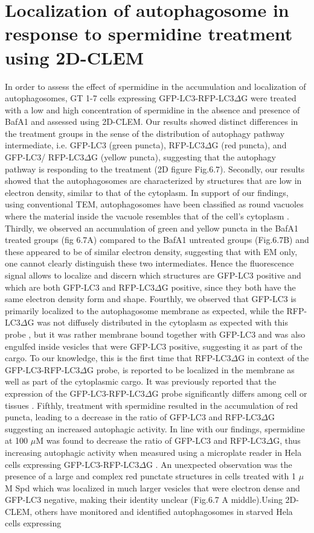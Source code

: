 \section{Localization of autophagosome in response to spermidine treatment using 2D-CLEM}
In order to assess the effect of spermidine in the accumulation and localization of  autophagosomes, GT 1-7 cells expressing GFP-LC3-RFP-LC3$\Delta$G were treated with a low and high concentration of spermidine in the absence and presence of BafA1 and assessed using 2D-CLEM. Our results showed distinct differences in the treatment groups in the sense of the distribution of autophagy pathway intermediate, i.e. GFP-LC3 (green puncta), RFP-LC3$\Delta$G (red puncta), and GFP-LC3/ RFP-LC3$\Delta$G (yellow puncta), suggesting that the autophagy pathway is responding to the treatment (2D figure Fig.6.7). Secondly, our results showed that the autophagosomes are characterized by structures that are low in electron density, similar to that of the cytoplasm. In support of our findings, using conventional TEM, autophagosomes have been classified as round vacuoles where the material inside the vacuole resembles that of the cell’s cytoplasm \citep{Eskelinen2008}. Thirdly, we observed an accumulation of green and yellow puncta in the BafA1 treated groups (fig 6.7A) compared to the BafA1 untreated groups (Fig.6.7B) and these appeared to be of similar electron density, suggesting that with EM only, one cannot clearly distinguish these two intermediates. Hence the fluorescence signal allows to localize and discern which structures are GFP-LC3 positive and which are both GFP-LC3 and RFP-LC3$\Delta$G positive, since they both have the same electron density form and shape. Fourthly, we observed that GFP-LC3 is primarily localized to the autophagosome membrane as expected, while the RFP-LC3$\Delta$G was not diffusely distributed in the cytoplasm as expected with this probe \citep{Kaizuka2016}, but it was rather membrane bound together with GFP-LC3 and was also engulfed inside vesicles that were GFP-LC3 positive, suggesting it as part of the cargo. To our knowledge, this is the first time that RFP-LC3$\Delta$G in context of the GFP-LC3-RFP-LC3$\Delta$G probe, is reported to be localized in the membrane as well as part of the cytoplasmic cargo. It was previously reported that the expression of the GFP-LC3-RFP-LC3$\Delta$G probe significantly differs among cell or tissues \citep{MoulisandVindis2017}. Fifthly, treatment with spermidine resulted in the accumulation of red puncta, leading to a decrease in the ratio of GFP-LC3 and RFP-LC3$\Delta$G suggesting an increased autophagic activity. In line with our findings, spermidine at 100 $\mu$M was found to decrease the ratio of GFP-LC3 and RFP-LC3$\Delta$G, thus increasing autophagic activity when measured using a microplate reader in Hela cells expressing GFP-LC3-RFP-LC3$\Delta$G \citep{Kaizuka2016}. An unexpected observation was the presence of a large and complex red punctate structures in cells treated with 1 $\mu$M Spd which was localized in much larger vesicles that were electron dense and GFP-LC3 negative, making their identity unclear (Fig.6.7 A middle).Using 2D-CLEM, others have monitored and identified autophagosomes in starved Hela cells expressing 